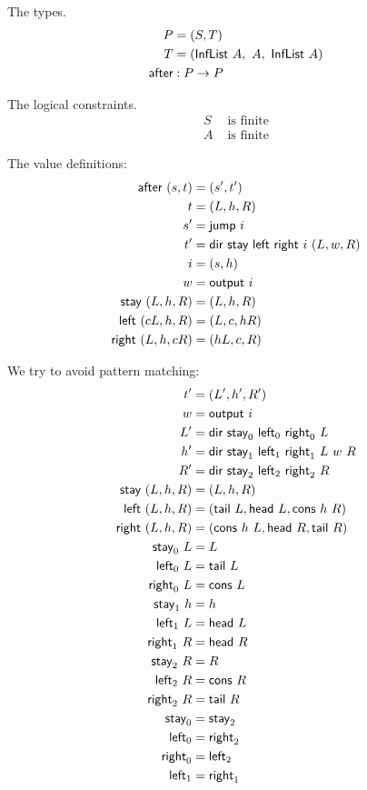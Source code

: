 The types.
\begin{align}
    P &= (S,T)
    \\
    T &= (\textsf{InfList}~A, ~ A, ~ \textsf{InfList}~A)
    \\
    \textsf{after} &: P \to P
\end{align}

The logical constraints.
\begin{align}
    S &\text{ is finite}
    \\
    A &\text{ is finite}
\end{align}

The value definitions:
\begin{align}
    \textsf{after}~(s,t) &= (s',t')
    \\
    t &= (L,h,R)
    \\
    s' &= \textsf{jump}~i
    \\
    t' &= \textsf{dir}~\textsf{stay}~\textsf{left}~\textsf{right}~i~(L,w,R)
    \\
    i &= (s,h)
    \\
    w &= \textsf{output}~i
    \\
    \textsf{stay}~(L,h,R) &= (L,h,R)
    \\
    \textsf{left}~(cL,h,R) &= (L,c,hR)
    \\
    \textsf{right}~(L,h,cR) &= (hL,c,R)
\end{align}

We try to avoid pattern matching:
\begin{align}
    t' &= (L',h',R')
    \\
    w &= \textsf{output}~i
    \\
    L' &= \textsf{dir}~\textsf{stay}_0~\textsf{left}_0~\textsf{right}_0~L
    \\
    h' &= \textsf{dir}~\textsf{stay}_1~\textsf{left}_1~\textsf{right}_1~L~w~R
    \\
    R' &= \textsf{dir}~\textsf{stay}_2~\textsf{left}_2~\textsf{right}_2~R
    \\
    \textsf{stay}~(L,h,R) &= (L,h,R)
    \\
    \textsf{left}~(L,h,R) &= (\textsf{tail}~L, \textsf{head}~L, \textsf{cons}~h~R)
    \\
    \textsf{right}~(L,h,R) &= (\textsf{cons}~h~L, \textsf{head}~R, \textsf{tail}~R)
    \\
    \textsf{stay}_0~L &= L
    \\
    \textsf{left}_0~L &= \textsf{tail}~L
    \\
    \textsf{right}_0~L &= \textsf{cons}~L
    \\
    \textsf{stay}_1~h &= h
    \\
    \textsf{left}_1~L &= \textsf{head}~L
    \\
    \textsf{right}_1~R &= \textsf{head}~R
    \\
    \textsf{stay}_2~R &= R
    \\
    \textsf{left}_2~R &= \textsf{cons}~R
    \\
    \textsf{right}_2~R &= \textsf{tail}~R
    \\
    \textsf{stay}_0 &= \textsf{stay}_2
    \\
    \textsf{left}_0 &= \textsf{right}_2
    \\
    \textsf{right}_0 &= \textsf{left}_2
    \\
    \textsf{left}_1 &= \textsf{right}_1
\end{align}

